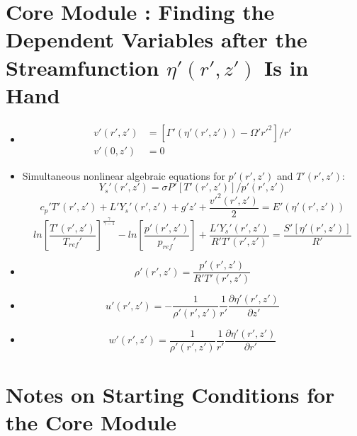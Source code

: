 \documentclass[preprint, prX]{revtex4}
\newcommand{\sbfrac}[2]{\left[\frac{#1}{#2}\right]}
\newcommand{\pd}[2]{\frac{\partial#1}{\partial#2}}
\newcommand{\gogmo}{\frac{\gamma}{\gamma-1}}
\begin{document}
\section{Core Module : Finding the Dependent Variables after the Streamfunction $\eta'(r',z')$ Is in Hand}
\begin{itemize}
\item
\begin{equation}
\begin{split}
v'(r',z') &= \left[ \Gamma'(\eta'(r',z')) -\Omega'r'^2 \right]/r' \\
v'(0,z') &= 0
\end{split}
\end{equation}
\item
Simultaneous nonlinear algebraic equations for $p'(r',z')$ and $T'(r',z')$:
\begin{equation}
Y_s'(r',z') = \sigma P'[T'(r',z')] /p'(r',z')
\end{equation}
\begin{equation}
c_p'T'(r',z') + L'Y_s'(r',z') + g'z' + \frac{v'^2(r',z')}{2} = E'(\eta'(r',z'))
\end{equation}
\begin{equation}
ln \sbfrac{T'(r',z')}{T_{ref}'}^\gogmo - ln \sbfrac{p'(r',z')}{p_{ref}'} + \frac{L'Y_s'(r',z')}{R'T'(r',z')} = \frac{S'[\eta'(r',z')]}{R'}
\end{equation}

\item
\begin{equation}
\rho'(r',z') = \frac{p'(r',z')}{R' T'(r',z')}
\end{equation}

\item
\begin{equation}
u'(r',z') = -\frac{1}{\rho'(r',z')}\frac{1}{r'}\pd{\eta'(r',z')}{z'}
\end{equation}

\item
\begin{equation}
w'(r',z') = \frac{1}{\rho'(r',z')}\frac{1}{r'}\pd{\eta'(r',z')}{r'}
\end{equation}

\end{itemize}

\section{Notes on Starting Conditions for the Core Module}
\begin{figure}[h!]
	\centering
	\def\svgwidth{0.7\columnwidth}
	
\end{figure}
\end{document}
